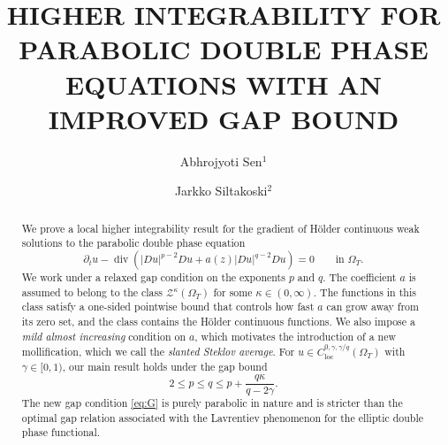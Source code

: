 \documentclass[notitlepage,11pt,reqno]{amsart}
\theoremstyle{definition}
\numberwithin{equation}{section}
\newcommand{\ttl}{\MakeUppercase{Higher integrability for parabolic double phase equations with an improved gap bound}}
\begin{document}
\title[H\"older continuous solutions to parabolic double phase equations]
{\ttl}
\author{Abhrojyoti Sen$^1$} 
\address{$^1$Goethe-Universit\"{a}t Frankfurt, Institut f\"{u}r Mathematik, Robert-Mayer-Str. 10,
 D-60629 Frankfurt, Germany. Email: sen@math.uni-frankfurt.de}
 
\author{Jarkko Siltakoski$^2$}
\address{$^2$Department of Mathematics and Statistics, University of Jyv\"askyl\"a, PO Box 35, 40014 Jyvaskyla, Finland. Email address: jarkko.siltakoski@jyu.fi}


\begin{abstract}
We prove a local higher integrability result for the gradient of H\"older
continuous weak solutions to the parabolic double phase equation
\[
\partial_t u - \operatorname{div} \left(|Du|^{p-2}Du + a(z)|Du|^{q-2}Du\right)
  = 0 \qquad \text{in } \Omega_T.
\]
We work under a relaxed gap condition on the exponents $p$ and $q$. The
coefficient $a$ is assumed to belong to the class $\mathcal{Z}^{\kappa}(\Omega_T)$ for some $\kappa \in (0,\infty)$. The functions in this class satisfy a one-sided
pointwise bound that controls how fast $a$ can grow away from its zero set,
and the class contains the H\"older continuous functions. We also impose a \emph{mild almost increasing} condition on $a$, which motivates the introduction of a new mollification, which we call the \emph{slanted Steklov average}. For $u \in C^{0,\gamma,\gamma/q}_{\mathrm{loc}}(\Omega_T)$ with $\gamma \in [0,1)$,
our main result holds under the gap bound
\begin{equation}\tag{G}\label{eq:G}
  2 \le p \le q \le p + \frac{q\kappa}{q - 2\gamma}.
\end{equation}
The new gap condition \eqref{eq:G} is purely parabolic in nature and is
stricter than the optimal gap relation associated with the Lavrentiev
phenomenon for the elliptic double phase functional.
\end{abstract}
%
%



\maketitle
\tableofcontents
\end{document}
